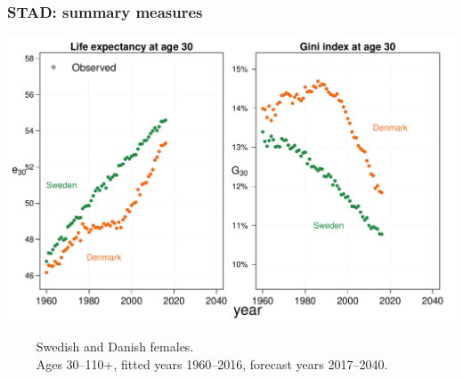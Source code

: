 \documentclass[12pt, xcolor=table]{beamer}  %
\begin{document}
\begin{frame}\frametitle{STAD: summary measures}

\vspace{-0.5cm}
	
	
	\begin{center}	
		\vspace{0.4cm}
		
		\includegraphics[scale=.42]{Figures/Ch2/F4_1}
		
	\end{center}

\vspace{-0.3cm}
\tiny{$\quad\quad$ Swedish and Danish females. \\ $\quad\quad$ Ages 30--110+, fitted years 1960--2016, forecast years 2017--2040.}

	
\end{frame}

%
%	
%	
%		
%	
%		
%	
\end{document}

